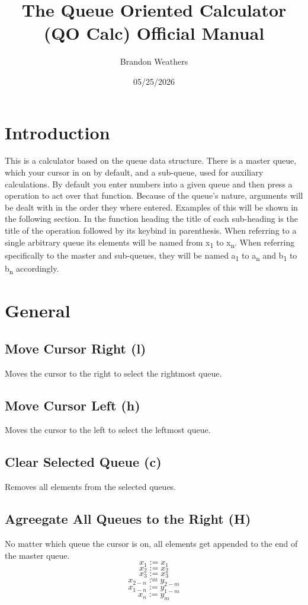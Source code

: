 \documentclass[12pt]{article}
\author{Brandon Weathers}
\date{05/25/2026}
\title{The Queue Oriented Calculator (QO Calc) Official Manual}
\begin{document}
\maketitle
\section*{Introduction}
\label{sec:org48190ca}
This is a calculator based on the queue data structure.
There is a master queue, which your cursor in on by default, and a sub-queue, used for auxiliary calculations.
By default you enter numbers into a given queue and then press a operation to act over that function.
Because of the queue's nature, arguments will be dealt with in the order they where entered.
Examples of this will be shown in the following section.
In the function heading the title of each sub-heading is the title of the operation followed by its keybind in parenthesis. 
When referring to a single arbitrary queue its elements will be named from x\textsubscript{1} to x\textsubscript{n}.
When referring specifically to the master and sub-queues, they will be named a\textsubscript{1} to a\textsubscript{n} and b\textsubscript{1} to b\textsubscript{n} accordingly.
\section*{General}
\label{sec:org9e27c45}
\subsection*{Move Cursor Right (l)}
\label{sec:org95fa8f0}
Moves the cursor to the right to select the rightmost queue.
\subsection*{Move Cursor Left (h)}
\label{sec:org7138edc}
Moves the cursor to the left to select the leftmost  queue.
\subsection*{Clear Selected Queue (c)}
\label{sec:org4d18381}
Removes all elements from the selected queues.
\subsection*{Agreegate All Queues to the Right (H)}
\label{sec:org2fa4995}
No matter which queue the cursor is on, all elements get appended to the end of the master queue.
$$
x_1 := x_1
$$
$$
x_2 := x_2
$$
$$
x_3 := x_3
$$
$$
...
$$
$$
x_{2-n} := y_{2-m}
$$
$$
x_{1-n} := y_{1-m}
$$
$$
x_{n} := y_{m}
$$
\end{document}
